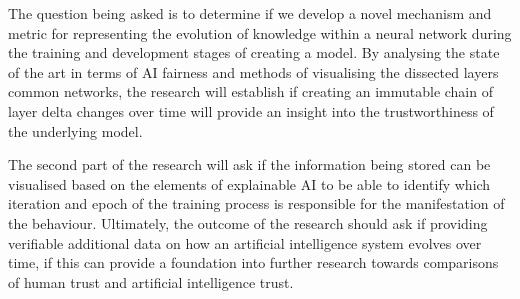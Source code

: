 The question being asked is to determine if we develop a novel mechanism and metric for
representing the evolution of knowledge within a neural network during the
training and development stages of creating a model. By analysing the state of
the art in terms of AI fairness and methods of visualising the dissected layers
common networks, the research will establish if creating an immutable chain of
layer delta changes over time will provide an insight into the trustworthiness
of the underlying model.

 The second part of the research will ask if the
information being stored can be visualised based on the elements of explainable
AI to be able to identify which iteration and epoch of the training process is
responsible for the manifestation of the behaviour. Ultimately, the outcome of
the research should ask if providing verifiable additional data on how an
artificial intelligence system evolves over time, if this can provide a
foundation into further research towards comparisons of human trust and
artificial intelligence trust.
